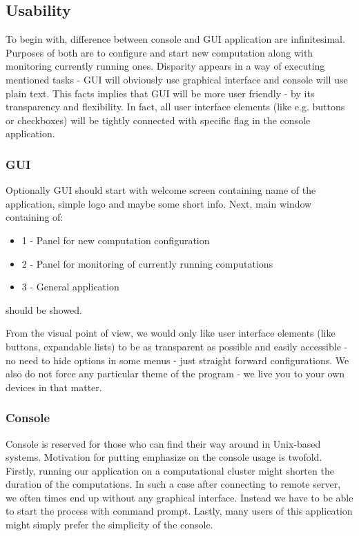 \documentclass{article}
\begin{document}
%
%
\subsection{Usability} \label{usability}
To begin with, difference between console and GUI application are infinitesimal. Purposes of both are to configure and start new computation along with monitoring currently running ones.
Disparity appears in a way of executing mentioned tasks - GUI will obviously use graphical interface and console will use plain text. This facts implies that GUI will be more user friendly - by its transparency and flexibility. In fact, all user interface elements (like e.g. buttons or checkboxes) will be tightly connected with specific flag in the console application.


\subsubsection{GUI}
Optionally GUI should start with welcome screen containing name of the application, simple logo and maybe some short info. Next, main window containing of:
\begin{itemize} 
\item 1 - Panel for new computation configuration
\item 2 - Panel for monitoring of currently running computations
\item 3 - General application 
\end{itemize} 
should be showed. 

From the visual point of view, we would only like user interface elements (like buttons, expandable lists) to be as transparent as possible and easily accessible - no need to hide options in some menus - just straight forward configurations. We also do not force any particular theme of the program - we live you to your own devices in that matter.


\subsubsection{Console}
Console is reserved for those who can find their way around in Unix-based systems. Motivation for putting emphasize on the console usage is twofold. Firstly, running our application on a computational cluster might shorten the duration of the computations. In such a case after connecting to remote server, we often times end up without any graphical interface. Instead we have to be able to start the process with command prompt. Lastly, many users of this application might simply prefer the simplicity of the console.
\end{document}
